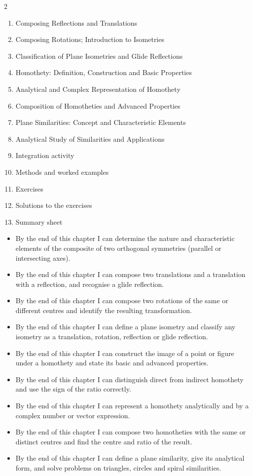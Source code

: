 \documentclass[11pt]{article}
\begin{document}
\begin{sommaire}
\begin{multicols}{2}
\begin{enumerate}
\item Composing Reflections and Translations
\item Composing Rotations; Introduction to Isometries
\item Classification of Plane Isometries and Glide Reflections
\item Homothety: Definition, Construction and Basic Properties
\item Analytical and Complex Representation of Homothety
\item Composition of Homotheties and Advanced Properties
\item Plane Similarities: Concept and Characteristic Elements
\item Analytical Study of Similarities and Applications
\item Integration activity
\item Methods and worked examples
\item Exercises
\item Solutions to the exercises
\item Summary sheet
\end{enumerate}
\end{multicols}
\end{sommaire}

\begin{objectifs}
\begin{itemize}
\item By the end of this chapter I can determine the nature and characteristic elements of the composite of two orthogonal symmetries (parallel or intersecting axes).
\item By the end of this chapter I can compose two translations and a translation with a reflection, and recognise a glide reflection.
\item By the end of this chapter I can compose two rotations of the same or different centres and identify the resulting transformation.
\item By the end of this chapter I can define a plane isometry and classify any isometry as a translation, rotation, reflection or glide reflection.
\item By the end of this chapter I can construct the image of a point or figure under a homothety and state its basic and advanced properties.
\item By the end of this chapter I can distinguish direct from indirect homothety and use the sign of the ratio correctly.
\item By the end of this chapter I can represent a homothety analytically and by a complex number or vector expression.
\item By the end of this chapter I can compose two homotheties with the same or distinct centres and find the centre and ratio of the result.
\item By the end of this chapter I can define a plane similarity, give its analytical form, and solve problems on triangles, circles and spiral similarities.
\end{itemize}
\end{objectifs}
\end{document}
